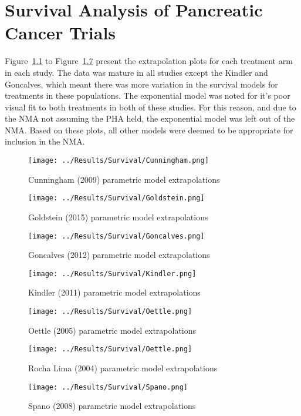 \chapter{Survival Analysis of Pancreatic Cancer Trials}

Figure~\ref{fig:cunninghamParamExtrap} to Figure~\ref{fig:spanoParamExtrap} present the extrapolation plots for each treatment arm in each study. The data was mature in all studies except the Kindler and Goncalves, which meant there was more variation in the survival models for treatments in these populations. The exponential model was noted for it's poor visual fit to both treatments in both of these studies. For this reason, and due to the NMA not assuming the PHA held, the exponential model was left out of the NMA. Based on these plots, all other models were deemed to be appropriate for inclusion in the NMA. \\

\begin{figure}
    \centering
    \texttt{[image: ../Results/Survival/Cunningham.png]}
    \caption{Cunningham (2009) parametric model extrapolations}
    \label{fig:cunninghamParamExtrap}
\end{figure}

\begin{figure}
    \centering
    \texttt{[image: ../Results/Survival/Goldstein.png]}
    \caption{Goldstein (2015) parametric model extrapolations}
    \label{fig:goldsteinParamExtrap}
\end{figure}

\begin{figure}
    \centering
    \texttt{[image: ../Results/Survival/Goncalves.png]}
    \caption{Goncalves (2012) parametric model extrapolations}
    \label{fig:goncalvesParamExtrap}
\end{figure}

\begin{figure}
    \centering
    \texttt{[image: ../Results/Survival/Kindler.png]}
    \caption{Kindler (2011) parametric model extrapolations}
    \label{fig:kindlerParamExtrap}
\end{figure}

\begin{figure}
    \centering
    \texttt{[image: ../Results/Survival/Oettle.png]}
    \caption{Oettle (2005) parametric model extrapolations}
    \label{fig:oettleParamExtrap}
\end{figure}

\begin{figure}
    \centering
    \texttt{[image: ../Results/Survival/Oettle.png]}
    \caption{Rocha Lima (2004) parametric model extrapolations}
    \label{fig:rochaLimaParamExtrap}
\end{figure}

\begin{figure}
    \centering
    \texttt{[image: ../Results/Survival/Spano.png]}
    \caption{Spano (2008) parametric model extrapolations}
    \label{fig:spanoParamExtrap}
\end{figure}